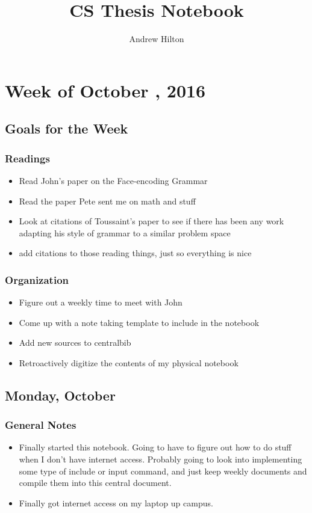 \documentclass[letterpaper,oneside,titlepage]{article}
\begin{document}
\title{CS Thesis Notebook}
\author{Andrew Hilton}
\maketitle


\sloppy
\section{Week of October , 2016}

\subsection{Goals for the Week}
\subsubsection{Readings}
\begin{itemize}
\item Read John's paper on the Face-encoding Grammar \cite{Rieffel:face-grammar}
\item Read the paper Pete sent me on math and stuff
\item Look at citations of Toussaint's paper
  \cite{toussaint2003demonstrating}
  to see if there has been any work adapting his style of grammar to a similar problem space
\item add citations to those reading things, just so everything is nice
\end{itemize}
\subsubsection{Organization}
\begin{itemize}
\item Figure out a weekly time to meet with John
\item Come up with a note taking template to include in the notebook
\item Add new sources to centralbib
\item Retroactively digitize the contents of my physical notebook
\end{itemize}

\subsection{Monday, October }
\subsubsection{General Notes}
\begin{itemize}
\item Finally started this notebook.  Going to have to figure out how to do stuff when I don't have internet access.  Probably going to look into implementing some type of include or input command, and just keep weekly documents and compile them into this central document.
\item Finally got internet access on my laptop up campus.
\end{itemize}
\end{document}
